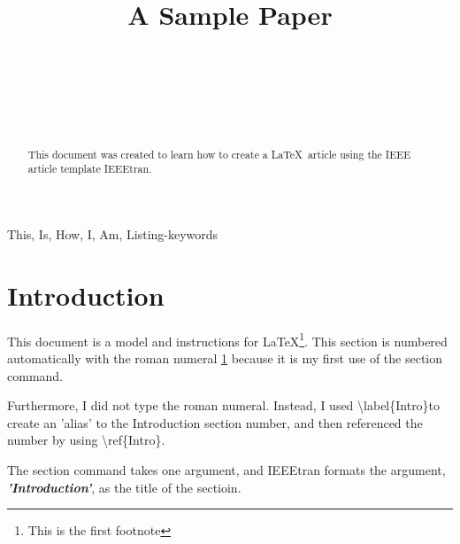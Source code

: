 \documentclass[conference]{IEEEtran}
\begin{document}
\title{A Sample Paper\\
}

\author{
 \\
\and
{}
 \\
\and
{}
\\
}
\maketitle

\begin{abstract}
This document was created to learn how to create a \LaTeX\ article using the IEEE article template IEEEtran.
\end{abstract}

\begin{IEEEkeywords}
This, Is, How, I, Am, Listing-keywords
\end{IEEEkeywords}

\section{Introduction}\label{Intro}
This document is a model and instructions for \LaTeX\footnote{This is the first footnote}.
This section is numbered automatically with the roman numeral \ref{Intro} because it is my first use of the section command.

Furthermore, I did not type the roman numeral. Instead, I used \textbackslash label\{Intro\}\footnotemark to create an 'alias' to the Introduction section number, and then referenced the number by using \textbackslash ref\{Intro\}\footnotemark[\value{footnote}].


The section command takes one argument, and IEEEtran formats the argument, \textbf{\textit{'Introduction'}}, as the title of the sectioin.
\end{document}
